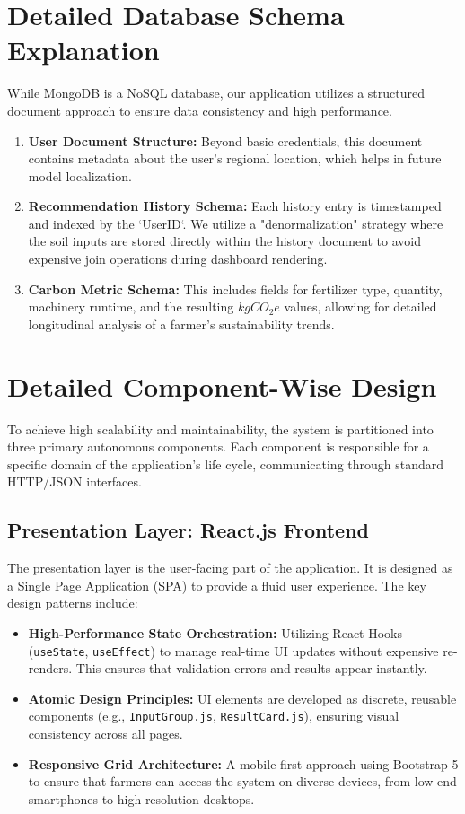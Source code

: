 \documentclass[12pt,a4paper]{report}
\begin{document}
\section{Detailed Database Schema Explanation}
While MongoDB is a NoSQL database, our application utilizes a structured document approach to ensure data consistency and high performance.
\begin{enumerate}
    \item \textbf{User Document Structure:} Beyond basic credentials, this document contains metadata about the user's regional location, which helps in future model localization.
    \item \textbf{Recommendation History Schema:} Each history entry is timestamped and indexed by the `UserID`. We utilize a "denormalization" strategy where the soil inputs are stored directly within the history document to avoid expensive join operations during dashboard rendering.
    \item \textbf{Carbon Metric Schema:} This includes fields for fertilizer type, quantity, machinery runtime, and the resulting $kgCO_2e$ values, allowing for detailed longitudinal analysis of a farmer's sustainability trends.
\end{enumerate}

\section{Detailed Component-Wise Design}
\label{sec:4.5}
To achieve high scalability and maintainability, the system is partitioned into three primary autonomous components. Each component is responsible for a specific domain of the application's life cycle, communicating through standard HTTP/JSON interfaces.

\subsection{Presentation Layer: React.js Frontend}
The presentation layer is the user-facing part of the application. It is designed as a Single Page Application (SPA) to provide a fluid user experience. The key design patterns include:
\begin{itemize}
    \item \textbf{High-Performance State Orchestration:} Utilizing React Hooks (\texttt{useState}, \texttt{useEffect}) to manage real-time UI updates without expensive re-renders. This ensures that validation errors and results appear instantly.
    \item \textbf{Atomic Design Principles:} UI elements are developed as discrete, reusable components (e.g., \texttt{InputGroup.js}, \texttt{ResultCard.js}), ensuring visual consistency across all pages.
    \item \textbf{Responsive Grid Architecture:} A mobile-first approach using Bootstrap 5 to ensure that farmers can access the system on diverse devices, from low-end smartphones to high-resolution desktops.
\end{itemize}
\end{document}

